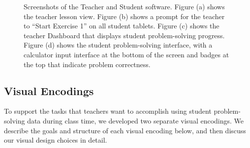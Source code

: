 \documentclass{sigchi}
\begin{document}
\begin{figure}[t]
\centering
{} \hspace{1em}%
 \hspace{1em}%
\caption{
Screenshots of the Teacher and Student software. Figure (a) shows the teacher lesson view. Figure (b) shows a prompt for the teacher to ``Start Exercise 1'' on all student tablets. Figure (c) shows the teacher Dashboard that displays student problem-solving progress. Figure (d) shows the student problem-solving interface, with a calculator input interface at the bottom of the screen and badges at the top that indicate problem correctness. }
\label{fig:Spreadsheet}
\end{figure}



\subsection{Visual Encodings}
To support the tasks that teachers want to accomplish using student problem-solving data during class time, we developed two separate visual encodings. We describe the goals and structure of each visual encoding below, and then discuss our visual design choices in detail.
\end{document}
